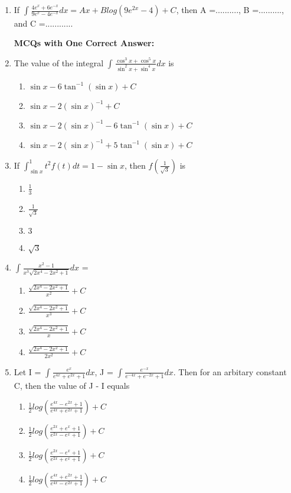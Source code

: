 \renewcommand{\theequation}{\theenumi}
\begin{enumerate}[label=\arabic*.,ref=\thesubsection.\theenumi]

\item If $\int_{}\frac{4e^{x} + 6e^{-x}}{9e^{x} - 4e^{-x}}dx = Ax + Blog(9e^{2x} - 4) + C$, then A =.........., B =.........., and C =............

\textbf{ MCQs with One Correct Answer:}
\item The value of the integral $\int_{}\frac{\cos^{3}x + \cos^{5}x}{\sin^{2}x + \sin^{4}x}dx$ is
\begin{enumerate}
\item $\sin x - 6\tan^{-1}(\sin x) + C$
\item $\sin x - 2(\sin x)^{-1} + C$
\item $\sin x - 2(\sin x)^{-1} - 6\tan^{-1}(\sin x) + C$
\item $\sin x - 2(\sin x)^{-1} + 5\tan^{-1}(\sin x) + C$
\end{enumerate}

\item If $\int_{\sin x}^{1}t^{2}f(t)dt = 1 - \sin x$, then $f(\frac{1}{\sqrt{3}})$ is
\begin{enumerate}
\item $\frac{1}{3}$
\item $\frac{1}{\sqrt{3}}$
\item $3$
\item $\sqrt{3}$
\end{enumerate}

\item $\int_{}\frac{x^2 - 1}{x^3\sqrt{2x^4 - 2x^2 + 1}}dx$ =
\begin{enumerate}
\item $\frac{\sqrt{2x^4 - 2x^2 + 1}}{x^2} + C$
\item $\frac{\sqrt{2x^4 - 2x^2 + 1}}{x^3} + C$
\item $\frac{\sqrt{2x^4 - 2x^2 + 1}}{x} + C$
\item $\frac{\sqrt{2x^4 - 2x^2 + 1}}{2x^2} + C$
\end{enumerate}

\item Let I = $\int_{}\frac{e^x}{e^{4x} + e^{2x} + 1}dx$, J = $\int_{}\frac{e^{-x}}{e^{-4x} + e^{-2x} + 1}dx$. Then for an arbitary constant C, then the value of J - I equals
\begin{enumerate}
\item $\frac{1}{2}log(\frac{e^{4x} - e^{2x} + 1}{e^{4x} + e^{2x} + 1}) + C$
\item $\frac{1}{2}log(\frac{e^{2x} + e^{x} + 1}{e^{2x} - e^{x} + 1}) + C$
\item $\frac{1}{2}log(\frac{e^{2x} - e^{x} + 1}{e^{2x} + e^{x} + 1}) + C$
\item $\frac{1}{2}log(\frac{e^{4x} + e^{2x} + 1}{e^{4x} - e^{2x} + 1}) + C$
\end{enumerate}


\end{enumerate}
